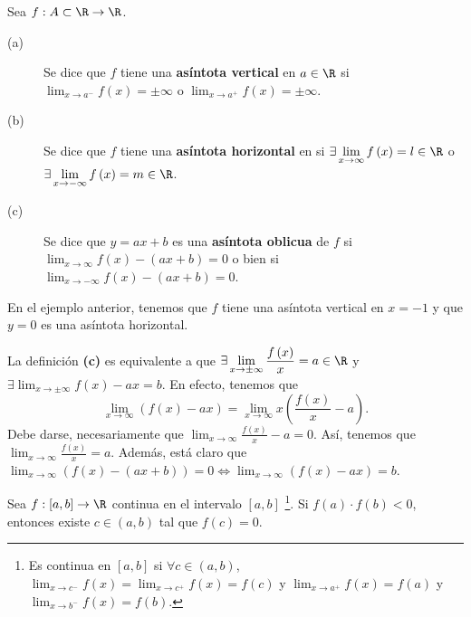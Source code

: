 \begin{fdefinition}[Asíntotas]
\normalfont Sea $\displaystyle f : A \subset \R \to \R $. 
\begin{description}
\item[(a)] Se dice que $\displaystyle f $ tiene una \textbf{asíntota vertical} en $\displaystyle a \in \R $ si $\displaystyle \lim_{x \to a^{-}}f\left(x\right) = \pm \infty $ o $\displaystyle \lim_{x \to a^{+}}f\left(x\right) = \pm \infty  $. \\
\item[(b)] Se dice que $\displaystyle f $ tiene una \textbf{asíntota horizontal} en si $\displaystyle \exists \lim_{x \to \infty}f\left(x\right) = l \in \R $ o $\displaystyle \exists \lim_{x \to -\infty} f\left(x\right) = m \in \R $.
\item[(c)] Se dice que $\displaystyle y = ax + b $ es una \textbf{asíntota oblicua} de $\displaystyle f $ si $\displaystyle \lim_{x \to \infty}f\left(x\right) - \left(ax+b\right) = 0 $ o bien si $\displaystyle \lim_{x \to -\infty}f\left(x\right)-\left(ax+b\right) = 0 $.
\end{description}
\end{fdefinition}
\begin{observation}
\normalfont En el ejemplo anterior, tenemos que $\displaystyle f $ tiene una asíntota vertical en $\displaystyle x = -1 $ y que $\displaystyle y = 0 $ es una asíntota horizontal.
\end{observation}
\begin{observation}
\normalfont La definición \textbf{(c)} es equivalente a que $\displaystyle \exists \lim_{x \to \pm\infty}\frac{f\left(x\right)}{x} = a \in \R $ y $\displaystyle \exists \lim_{x \to \pm\infty}f\left(x\right)-ax = b $. En efecto, tenemos que 
\[\lim_{x \to \infty}\left(f\left(x\right)-ax\right) = \lim_{x \to \infty} x\left(\frac{f\left(x\right)}{x}-a\right) .\]
Debe darse, necesariamente que $\displaystyle \lim_{x \to \infty}\frac{f\left(x\right)}{x}-a = 0 $. Así, tenemos que $\displaystyle \lim_{x \to \infty}\frac{f\left(x\right)}{x} = a $. Además, está claro que $\displaystyle \lim_{x \to \infty}\left(f\left(x\right)-\left(ax + b\right)\right) = 0 \iff \lim_{x \to \infty}\left(f\left(x\right)-ax\right) = b $.
\end{observation}
\begin{ftheorem}
	\normalfont Sea $\displaystyle f : [a,b] \to \R $ continua en el intervalo $\displaystyle [a,b] $ \footnote{Es continua en $\displaystyle [a,b] $ si $\displaystyle \forall c \in \left(a,b\right) $, $\displaystyle \lim_{x \to c^{-}}f\left(x\right) = \lim_{x \to c^{+}}f\left(x\right) = f\left(c\right) $ y $\displaystyle \lim_{x \to a^{+}}f\left(x\right) = f\left(a\right) $ y $\displaystyle \lim_{x \to b^{-}}f\left(x\right) = f\left(b\right) $.}. Si $\displaystyle f\left(a\right) \cdot f\left(b\right) < 0 $, entonces existe $\displaystyle c \in \left(a,b\right) $ tal que $\displaystyle f\left(c\right) = 0 $.
\end{ftheorem}
